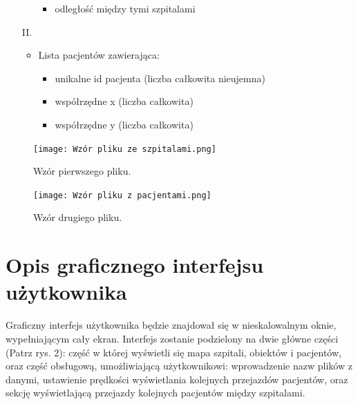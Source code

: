 \documentclass{article}
\begin{document}
\begin{itemize}
\begin{itemize}
\begin{itemize}
                        \item odległość między tymi szpitalami
                    \end{itemize}
                \end{itemize}
            \item[II.]
                \begin{itemize}
                    \item Lista pacjentów zawierająca:
                    \begin{itemize}
                        \item unikalne id pacjenta (liczba całkowita nieujemna)
                        \item współrzędne x (liczba całkowita)
                        \item współrzędne y (liczba całkowita)
                    \end{itemize}
                \end{itemize}
        \end{itemize}
        
    \begin{figure}[h]
    \centering
    \texttt{[image: Wzór pliku ze szpitalami.png]}
    \caption{Wzór pierwszego pliku.}
    \end{figure}
    
    \begin{figure}[h]
    \centering
    \texttt{[image: Wzór pliku z pacjentami.png]}
    \caption{Wzór drugiego pliku.}
    \end{figure}
    
\section{Opis graficznego interfejsu użytkownika}
    Graficzny interfejs użytkownika będzie znajdował się w nieskalowalnym oknie, wypełniającym cały ekran. Interfejs zostanie podzielony na dwie główne części (Patrz rys. 2): część w której wyświetli się mapa szpitali, obiektów i pacjentów, oraz część obsługową, umożliwiającą użytkownikowi: wprowadzenie nazw plików z danymi, ustawienie prędkości wyświetlania kolejnych przejazdów pacjentów, oraz sekcję wyświetlającą przejazdy kolejnych pacjentów między szpitalami.
    
\end{document}
